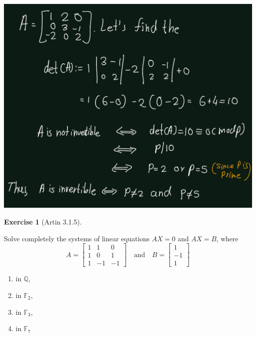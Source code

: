 \documentclass[
]{book}
\providecommand{\tightlist}{%
  \setlength{\itemsep}{0pt}\setlength{\parskip}{0pt}}
\theoremstyle{definition}
\theoremstyle{definition}
\theoremstyle{definition}
\newtheorem{exercise}{Exercise}[chapter]
\theoremstyle{definition}
\theoremstyle{remark}
\begin{document}
\includegraphics{figures/ch_3/ex-1.5.png}

\begin{exercise}[Artin 3.1.5]
\protect\hypertarget{exr:unnamed-chunk-257}{}\label{exr:unnamed-chunk-257}

Solve completely the systems of linear equations \(AX = 0\) and \(AX = B\), where
\[
A = \begin{bmatrix} 1 & 1 & 0 \\ 1 & 0 & 1 \\ 1 & -1 & -1 \end{bmatrix} \quad \text{and} \quad B = \begin{bmatrix} 1 \\ -1 \\ 1 \end{bmatrix}
\]

\begin{enumerate}
\def\labelenumi{(\alph{enumi})}
\tightlist
\item
  in \(\mathbb{Q}\),
\item
  in \(\mathbb{F}_2\),
\item
  in \(\mathbb{F}_3\),
\item
  in \(\mathbb{F}_7\)
\end{enumerate}

\end{exercise}
\end{document}
